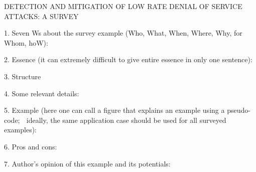 DETECTION AND MITIGATION OF LOW RATE DENIAL OF SERVICE ATTACKS: A SURVEY


1. Seven Ws about the survey example (Who, What, When, Where, Why, for Whom, hoW): 

2. Essence (it can extremely difficult to give entire essence in only one sentence):

3. Structure

4. Some relevant details:

5. Example (here one can call a figure that explains an example using a pseudo-code;  ideally, the same application case should be used for all surveyed examples):

6. Pros and cons:


7. Author’s opinion of this example and its potentials:

